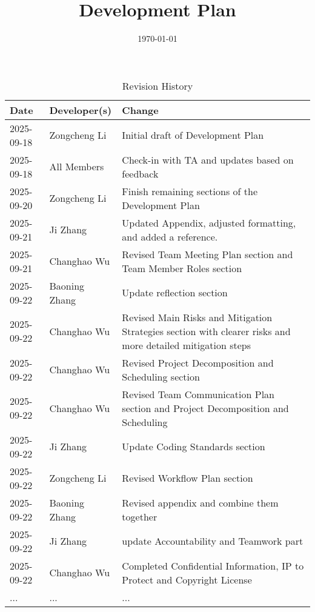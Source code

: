 \documentclass{article}
\title{Development Plan\\\progname}
\author{\authname}
\date{\today}
\begin{document}
\maketitle

\begin{table}[hp]
\caption{Revision History} \label{TblRevisionHistory}
\begin{tabularx}{\textwidth}{llX}
\toprule
\textbf{Date} & \textbf{Developer(s)} & \textbf{Change}\\
\midrule
2025-09-18  & Zongcheng Li     & Initial draft of Development Plan \\
2025-09-18  & All Members      & Check-in with TA and updates based on feedback \\
2025-09-20  & Zongcheng Li     & Finish remaining sections of the Development Plan \\
2025-09-21  & Ji Zhang         & Updated Appendix, adjusted formatting, and added a reference.\\
2025-09-21  & Changhao Wu      & Revised Team Meeting Plan section and Team Member Roles section \\
2025-09-22  & Baoning Zhang    & Update reflection section \\
2025-09-22  & Changhao Wu      & Revised Main Risks and Mitigation Strategies section with clearer risks and more detailed mitigation steps \\
2025-09-22  & Changhao Wu      & Revised Project Decomposition and Scheduling section \\
2025-09-22  & Changhao Wu      & Revised Team Communication Plan section and Project Decomposition and Scheduling\\
2025-09-22  & Ji Zhang         & Update Coding Standards section \\
2025-09-22  & Zongcheng Li     & Revised Workflow Plan section \\
2025-09-22  & Baoning Zhang    & Revised appendix and combine them together \\
2025-09-22  & Ji Zhang         & update Accountability and Teamwork part \\
2025-09-22  & Changhao Wu      & Completed Confidential Information, IP to Protect and Copyright License\\
...         & ... & ...\\

\bottomrule
\end{tabularx}
\end{table}

\newpage{}
\end{document}
